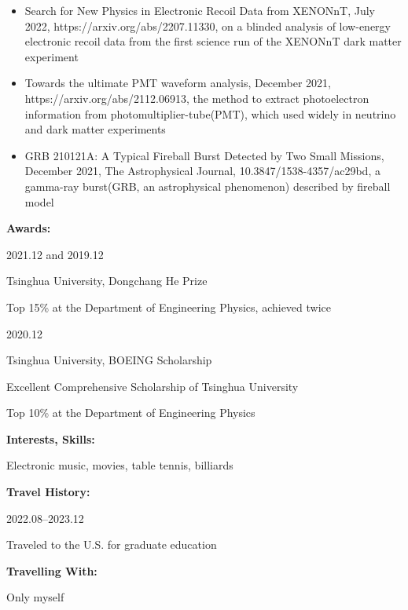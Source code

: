 \documentclass[11pt,a4paper,sans]{ctexart}
\begin{document}
\begin{itemize}
    \item Search for New Physics in Electronic Recoil Data from XENONnT, July 2022, https://arxiv.org/abs/2207.11330, on a blinded analysis of low-energy electronic recoil data from the first science run of the XENONnT dark matter experiment
    \item Towards the ultimate PMT waveform analysis, December 2021, https://arxiv.org/abs/2112.06913, the method to extract photoelectron information from photomultiplier-tube(PMT), which used widely in neutrino and dark matter experiments
    \item GRB 210121A: A Typical Fireball Burst Detected by Two Small Missions, December 2021, The Astrophysical Journal, 10.3847/1538-4357/ac29bd, a gamma-ray burst(GRB, an astrophysical phenomenon) described by fireball model
\end{itemize}

\vspace{0.5cm}
\textbf{Awards:}

\begin{minipage}[c]{0.3\linewidth}
    2021.12 and 2019.12
\end{minipage} %
\begin{minipage}[c]{0.7\linewidth}
    Tsinghua University, Dongchang He Prize

    Top 15\% at the Department of Engineering Physics, achieved twice
\end{minipage}

\vspace{0.2cm}

\begin{minipage}[c]{0.3\linewidth}
    2020.12
\end{minipage} %
\begin{minipage}[c]{0.7\linewidth}
    Tsinghua University, BOEING Scholarship

    Excellent Comprehensive Scholarship of Tsinghua University

    Top 10\% at the Department of Engineering Physics
\end{minipage}

\vspace{0.5cm}
\textbf{Interests, Skills:}

Electronic music, movies, table tennis, billiards

\vspace{0.5cm}
\textbf{Travel History:}

\begin{minipage}[c]{0.3\linewidth}
    2022.08--2023.12
\end{minipage} %
\begin{minipage}[c]{0.7\linewidth}
    Traveled to the U.S. for graduate education
\end{minipage}

\vspace{0.5cm}
\textbf{Travelling With:}

Only myself
\end{document}
